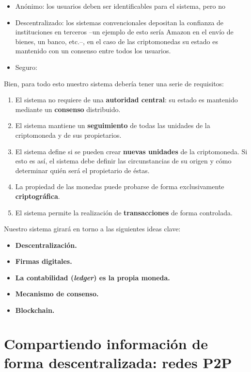 \documentclass[10pt, a4paper]{article}
\theoremstyle{theorem-style}
\theoremstyle{theorem-style}
\theoremstyle{definition-style}
\theoremstyle{remark-style}
\theoremstyle{example-style}
\theoremstyle{definition-style}
\theoremstyle{remark-style}
\begin{document}
\begin{itemize}
\itemsep1pt\parskip0pt
\item
  Anónimo: los usuarios deben ser identificables para el sistema, pero
  no
\item
  Descentralizado: los sistemas convencionales depositan la confianza de
  instituciones en terceros --un ejemplo de esto sería Amazon en el
  envío de bienes, un banco, etc.--, en el caso de las criptomonedas su
  estado es mantenido con un consenso entre todos los usuarios.
\item
  Seguro:
\end{itemize}

Bien, para todo esto nuestro sistema debería tener una serie de
requisitos:

\begin{enumerate}
\def\labelenumi{\arabic{enumi}.}
\itemsep1pt\parskip0pt
\item
  El sistema no requiere de una \textbf{autoridad central}: su estado es
  mantenido mediante un \textbf{consenso} distribuido.
\item
  El sistema mantiene un \textbf{seguimiento} de todas las unidades de
  la criptomoneda y de sus propietarios.
\item
  El sistema define si se pueden crear \textbf{nuevas unidades} de la
  criptomoneda. Si esto es así, el sistema debe definir las
  circunstancias de su origen y cómo determinar quién será el
  propietario de éstas.
\item
  La propiedad de las monedas puede probarse de forma exclusivamente
  \textbf{criptográfica}.
\item
  El sistema permite la realización de \textbf{transacciones} de forma
  controlada.
\end{enumerate}

Nuestro sistema girará en torno a las siguientes ideas clave:

\begin{itemize}
\itemsep1pt\parskip0pt
\item
  \textbf{Descentralización.}
\item
  \textbf{Firmas digitales.}
\item
  \textbf{La contabilidad (\emph{ledger}) es la propia moneda.}
\item
  \textbf{Mecanismo de consenso.}
\item
  \textbf{Blockchain.}
\end{itemize}

\section{Compartiendo información de forma descentralizada: redes
P2P}\label{compartiendo-informaciuxf3n-de-forma-descentralizada-redes-p2p}
\end{document}
